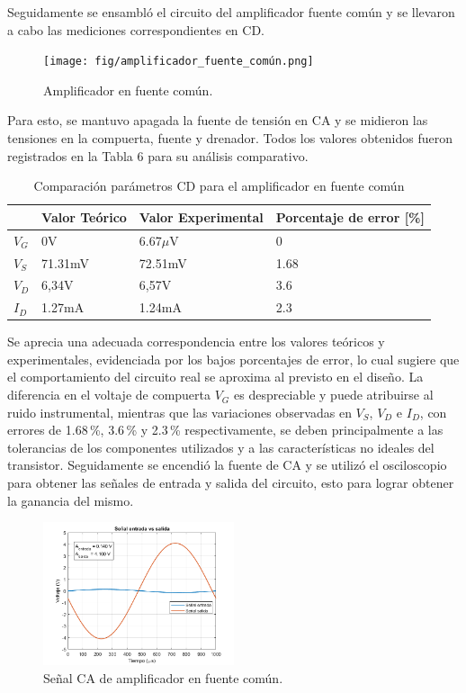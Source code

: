 \documentclass[journal]{IEEEtran}
\begin{document}
	\par Seguidamente se ensambló el circuito del amplificador fuente común y se llevaron a cabo las mediciones correspondientes en CD.
	\begin{figure}[H]
		\centering
		\texttt{[image: fig/amplificador\_fuente\_común.png]}
		\caption{Amplificador en fuente común.}
		\label{fig:amplificador_fuente_común}
	\end{figure}
	\par Para esto, se mantuvo apagada la fuente de tensión en CA y se midieron las tensiones en la compuerta, fuente y drenador. Todos los valores obtenidos fueron registrados en la Tabla 6 para su análisis comparativo.
	\begin{table}[h]
		\caption{Comparación parámetros CD para el amplificador en fuente común}
		\centering
		\renewcommand{\arraystretch}{1.2} %
		\begin{tabular}{|l|p{2cm}|p{2cm}|p{2cm}|}
			\hline
			& \textbf{Valor Teórico} & \textbf{Valor Experimental} & \textbf{Porcentaje de error [\%]} \\
			\hline
			\( V_G \) & 0V  & 6.67$\mu$V  & 0 \\
			\hline
			\( V_S \) & 71.31mV   & 72.51mV  & 1.68 \\
			\hline
			\( V_D \) & 6,34V & 6,57V & 3.6 \\
			\hline
			\( I_D \) & 1.27mA & 1.24mA & 2.3 \\
			\hline
		\end{tabular}
		\label{tab:circuito2}
	\end{table}
	\par Se aprecia una adecuada correspondencia entre los valores teóricos y experimentales, evidenciada por los bajos porcentajes de error, lo cual sugiere que el comportamiento del circuito real se aproxima al previsto en el diseño. La diferencia en el voltaje de compuerta \( V_G \) es despreciable y puede atribuirse al ruido instrumental, mientras que las variaciones observadas en \( V_S \), \( V_D \) e \( I_D \), con errores de 1.68\,\%, 3.6\,\% y 2.3\,\% respectivamente, se deben principalmente a las tolerancias de los componentes utilizados y a las características no ideales del transistor.
	Seguidamente se encendió la fuente de CA y se utilizó el osciloscopio para obtener las señales de entrada y salida del circuito, esto para lograr obtener la ganancia del mismo.
	\begin{figure}[H]
		\centering
		\includegraphics[width=0.5\textwidth]{fig/fc.png}
		\caption{Señal CA de amplificador en fuente común.}
		\label{fig:amplificador_fuente_común_CA}
	\end{figure}
\end{document}
